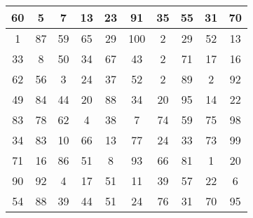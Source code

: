 \documentclass[11pt]{article}
\begin{document}
\begin{center}

\begin{tabular}{| c | c | c | c | c | c | c | c | c | c |}
\hline
60 & 5 & 7 & 13 & 23 & 91 & 35 & 55 & 31 & 70\\
\hline

1 & 87 & 59 & 65 & 29 & 100 & 2 & 29 & 52 & 13\\
\hline

33 & 8 & 50 & 34 & 67 & 43 & 2 & 71 & 17 & 16\\
\hline

62 & 56 & 3 & 24 & 37 & 52 & 2 & 89 & 2 & 92\\
\hline

49 & 84 & 44 & 20 & 88 & 34 & 20 & 95 & 14 & 22\\
\hline

83 & 78 & 62 & 4 & 38 & 7 & 74 & 59 & 75 & 98\\
\hline

34 & 83 & 10 & 66 & 13 & 77 & 24 & 33 & 73 & 99\\
\hline

71 & 16 & 86 & 51 & 8 & 93 & 66 & 81 & 1 & 20\\
\hline

90 & 92 & 4 & 17 & 51 & 11 & 39 & 57 & 22 & 6\\
\hline

54 & 88 & 39 & 44 & 51 & 24 & 76 & 31 & 70 & 95\\
\hline

\end{tabular}

\end{center}
\end{document}
